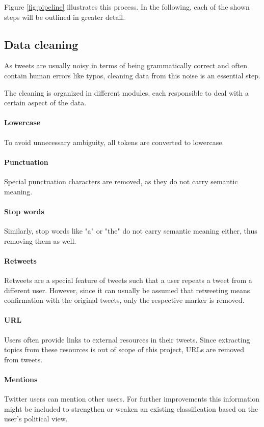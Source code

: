 \documentclass[sigconf, nonacm]{acmart}
\begin{document}
Figure \ref{fig:pipeline} illustrates this process. In the following, each of the shown steps will be outlined in greater detail.

\subsection{Data cleaning}
\label{subsec:clean}
As tweets are usually noisy in terms of being grammatically correct and often contain human errors like typos, cleaning data from this noise is an essential step.

The cleaning is organized in different modules, each responsible to deal with a certain aspect of the data.

\paragraph{Lowercase} To avoid unnecessary ambiguity, all tokens are converted to lowercase.

\paragraph{Punctuation} Special punctuation characters are removed, as they do not carry semantic meaning.

\paragraph{Stop words} Similarly, stop words like "a" or "the" do not carry semantic meaning either, thus removing them as well.

\paragraph{Retweets} Retweets are a special feature of tweets such that a user repeats a tweet from a different user. However, since it can usually be assumed that retweeting means confirmation with the original tweets, only the respective marker is removed.

\paragraph{URL} Users often provide links to external resources in their tweets. Since extracting topics from these resources is out of scope of this project, URLs are removed from tweets.

\paragraph{Mentions} Twitter users can mention other users. For further improvements this information might be included to strengthen or weaken an existing classification based on the user's political view.
\end{document}

